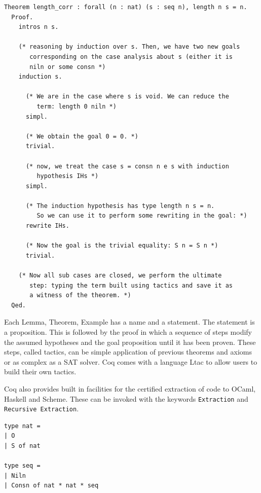 \documentclass[12pt,twoside,notitlepage]{report}
\begin{document}
\begin{minipage}{\linewidth}

\begin{lstlisting}[language={Coq},caption={Coq theorem example}]
Theorem length_corr : forall (n : nat) (s : seq n), length n s = n.
  Proof.
    intros n s.

    (* reasoning by induction over s. Then, we have two new goals
       corresponding on the case analysis about s (either it is 
       niln or some consn *)
    induction s.

      (* We are in the case where s is void. We can reduce the 
         term: length 0 niln *)
      simpl. 

      (* We obtain the goal 0 = 0. *)
      trivial.

      (* now, we treat the case s = consn n e s with induction 
         hypothesis IHs *)
      simpl. 

      (* The induction hypothesis has type length n s = n. 
         So we can use it to perform some rewriting in the goal: *)
      rewrite IHs. 

      (* Now the goal is the trivial equality: S n = S n *)
      trivial.

    (* Now all sub cases are closed, we perform the ultimate
       step: typing the term built using tactics and save it as
       a witness of the theorem. *)
  Qed.	  
\end{lstlisting}

\end{minipage}
Each Lemma, Theorem, Example has a name and a statement. The statement is a proposition. This is followed by the proof in which a sequence of steps modify the assumed hypotheses and the goal proposition until it has been proven. These steps, called tactics, can be simple application of previous theorems and axioms or as complex as a SAT solver. Coq comes with a language Ltac to allow users to build their own tactics.


Coq also provides built in facilities for the certified extraction of code to OCaml, Haskell and Scheme. These can be invoked with the keywords \lstinline[language={Coq}]|Extraction| and \lstinline[language={Coq}]|Recursive Extraction|. 
\vspace{3mm}

\begin{minipage}{\linewidth}

\begin{lstlisting}[caption={Coq to OCaml extraction of seq}]
type nat =
| O
| S of nat

type seq =
| Niln
| Consn of nat * nat * seq
\end{lstlisting}

\end{minipage}
\end{document}
